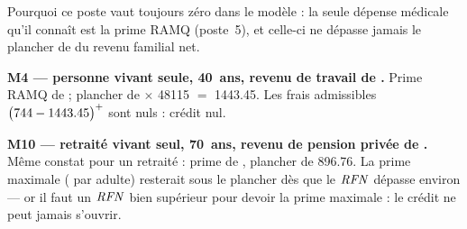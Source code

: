 \pexemples Pourquoi ce poste vaut toujours zéro dans le modèle : la seule dépense
médicale qu'il connaît est la prime RAMQ (poste~5), et celle-ci ne dépasse
jamais le plancher de  du revenu familial net.

\medskip\noindent\textbf{M4 --- personne vivant seule, 40~ans, revenu de travail de .}
Prime RAMQ de  ; plancher de 
$\times$ \num{48115} $=$ \num{1443.45}. Les frais admissibles
$\bigl(\num{744} - \num{1443.45}\bigr)^{+}$ sont nuls : crédit nul.

\medskip\noindent\textbf{M10 --- retraité vivant seul, 70~ans, revenu de pension privée de .}
Même constat pour un retraité : prime de , plancher de
\num{896.76}. La prime maximale ( par
adulte) resterait sous le plancher dès que le $\mathit{RFN}$ dépasse environ
 — or il faut un $\mathit{RFN}$ bien supérieur
pour devoir la prime maximale : le crédit ne peut jamais s'ouvrir.
